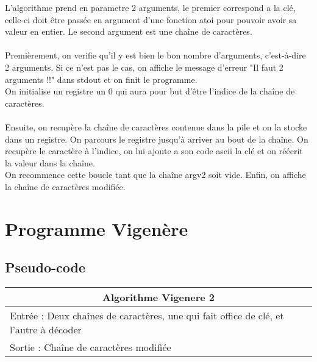 \documentclass[a4paper, 12pt]{article}
\begin{document}
L'algorithme prend en parametre 2 arguments, le premier correspond a la clé, celle-ci doit être passée en argument d'une fonction atoi pour pouvoir avoir sa valeur en entier.
Le second argument est une chaîne de caractères.
\\
\\
Premièrement, on verifie qu'il y est bien le bon nombre d'arguments, c'est-à-dire 2 arguments. Si ce n'est pas le cas, on affiche le message d'erreur "Il faut 2 arguments !!" dans stdout et on finit le programme.
\\
On initialise un registre un 0 qui aura pour but d'être l'indice de la chaîne de caractères.
\\
\\
Ensuite, on recupère la chaîne de caractères contenue dans la pile et on la stocke dans un registre. On parcours le registre jusqu'à arriver au bout de la chaîne. On recupère le caractère à l'indice, on lui ajoute a son code ascii la clé et on réécrit la valeur dans la chaîne.
\\
On recommence cette boucle tant que la chaîne argv2 soit vide.
Enfin, on affiche la chaîne de caractères modifiée.
\\

\newpage

\section{Programme Vigenère}

\subsection{Pseudo-code}

\begin{center}
  \begin{tabular}{|l|}
    \hline
    \multicolumn{1}{|c|}{ Algorithme Vigenere 2} \\
    \hline
    Entrée : Deux chaînes de caractères, une qui fait office de clé, et l'autre à décoder  \\
    \hline
    Sortie : Chaîne de caractères modifiée \\
    \hline
  \end{tabular}
\end{center}
\end{document}
